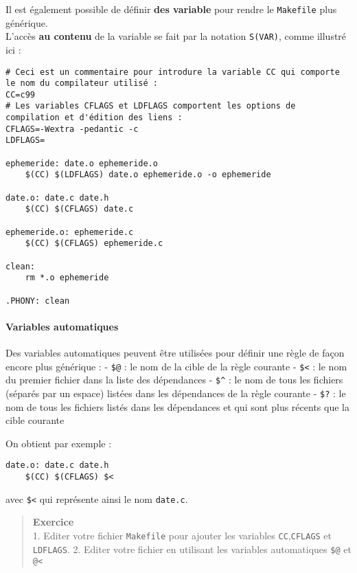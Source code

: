 \documentclass[11pt]{article}
\begin{document}
Il est également possible de définir \textbf{des variable} pour rendre
le \texttt{Makefile} plus générique.\\
L'accès \textbf{au contenu} de la variable se fait par la notation
\texttt{S(VAR)}, comme illustré ici :

\begin{verbatim}
# Ceci est un commentaire pour introdure la variable CC qui comporte le nom du compilateur utilisé :
CC=c99
# Les variables CFLAGS et LDFLAGS comportent les options de compilation et d'édition des liens :
CFLAGS=-Wextra -pedantic -c
LDFLAGS=

ephemeride: date.o ephemeride.o
    $(CC) $(LDFLAGS) date.o ephemeride.o -o ephemeride

date.o: date.c date.h
    $(CC) $(CFLAGS) date.c

ephemeride.o: ephemeride.c
    $(CC) $(CFLAGS) ephemeride.c
    
clean:
    rm *.o ephemeride
    
.PHONY: clean
\end{verbatim}

\paragraph{Variables automatiques}\label{variables-automatiques}

Des variables automatiques peuvent être utilisées pour définir une règle
de façon encore plus générique : - \texttt{\$@} : le nom de la cible de
la règle courante - \texttt{\$\textless{}} : le nom du premier fichier
dans la liste des dépendances - \texttt{\$\^{}} : le nom de tous les
fichiers (séparés par un espace) listées dans les dépendances de la
règle courante - \texttt{\$?} : le nom de tous les fichiers listés dans
les dépendances et qui sont plus récents que la cible courante

On obtient par exemple :

\begin{verbatim}
date.o: date.c date.h
    $(CC) $(CFLAGS) $<
\end{verbatim}

avec \texttt{\$\textless{}} qui représente ainsi le nom \texttt{date.c}.

\begin{quote}
\textbf{Exercice}\\
1. Editer votre fichier \texttt{Makefile} pour ajouter les variables
\texttt{CC},\texttt{CFLAGS} et \texttt{LDFLAGS}. 2. Editer votre fichier
en utilisant les variables automatiques \texttt{\$@} et
\texttt{@\textless{}}
\end{quote}
\end{document}
